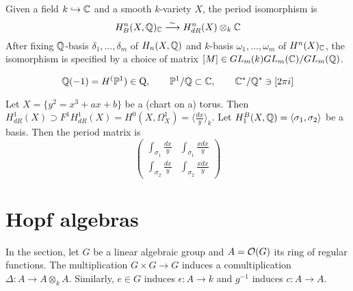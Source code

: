 \begin{defn}\label{def:periodisom}
Given a field $k \hookrightarrow \mathbb{C}$ and a smooth $k$-variety $X$, the period isomorphism is
\[
H^n_B(X, \mathbb{Q})_{\mathbb{C}} \stackrel{\sim}{\longrightarrow} H^n_{dR}(X) \otimes_k \mathbb{C}
\]
After fixing $\mathbb{Q}$-basis $\delta_1, \ldots, \delta_m$ of $H_n(X, \mathbb{Q})$ and $k$-basis $\omega_1, \ldots, \omega_m$ of $H^n(X)_{\mathbb{C}}$, the isomorphism is specified by a choice of matrix $[M] \in GL_m(k) \\ GL_m(\mathbb{C}) / GL_m(\mathbb{Q})$.
\end{defn}
\begin{exam}
\[
\mathbb{Q}(-1) = H^(\mathbb{P}^1) \in \mathrm{Q}, \qquad \mathbb{P}^1 / \mathbb{Q} \subset \mathbb{C}, \qquad \mathbb{C}^* / \mathbb{Q}^* \ni [2\pi i]
\]
\end{exam}
\begin{exam}
Let $X = \{y^2 = x^3 + ax + b\}$ be a (chart on a) torus. Then $H^1_{dR}(X) \supset F^1H^1_{dR}(X) = H^0(X, \Omega_X^1) = \langle \frac{dx}{y} \rangle_k$. Let $H^B_1(X, \mathbb{Q}) = \langle \sigma_1, \sigma_2 \rangle$ be a basis. Then the period matrix is
\[
\left( \begin{array}{cc}
\int_{\sigma_1} \frac{dx}{y} & \int_{\sigma_1} \frac{xdx}{y} \\
\int_{\sigma_2} \frac{dx}{y} & \int_{\sigma_2} \frac{xdx}{y}
\end{array}
\right)
\]
\end{exam}

\section{Hopf algebras}
In the section, let $G$ be a linear algebraic group and $A = \mathcal{O}(G)$ its ring of regular functions. The multiplication $G \times G \to G$ induces a comultiplication $\Delta : A \to A \otimes_k A$. Similarly, $e \in G$ induces $\epsilon : A \to k$ and $g^{-1}$ induces $c : A \to A$.

